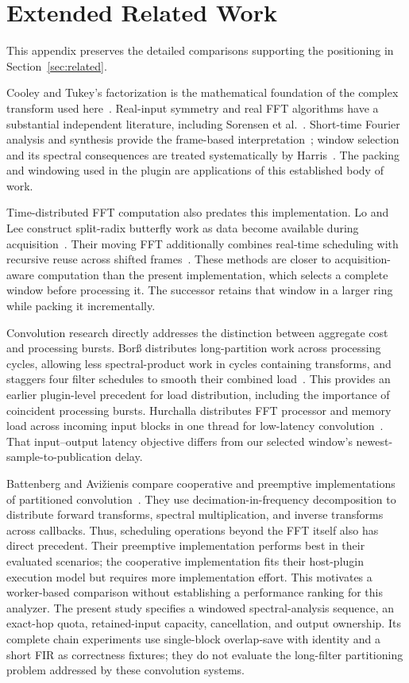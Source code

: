 \section{Extended Related Work}
\label{app:related-work}
This appendix preserves the detailed comparisons supporting the positioning
in Section~\ref{sec:related}.

Cooley and Tukey's factorization is the mathematical foundation of the complex
transform used here~\cite{cooley1965}. Real-input symmetry and real FFT
algorithms have a substantial independent literature, including Sorensen
et al.~\cite{sorensen1987}. Short-time Fourier analysis and synthesis provide
the frame-based interpretation~\cite{allen1977}; window selection and its
spectral consequences are treated systematically by Harris~\cite{harris1978}.
The packing and windowing used in the plugin are applications of this established
body of work.

Time-distributed FFT computation also predates this implementation. Lo and Lee
construct split-radix butterfly work as data become available during
acquisition~\cite{lo1998,lo1999}. Their moving FFT additionally combines
real-time scheduling with recursive reuse across shifted
frames~\cite{lomoving1999}. These methods are closer to acquisition-aware
computation than the present implementation, which selects a complete
window before processing it. The successor retains that window in a larger
ring while packing it incrementally.

Convolution research directly addresses the distinction between aggregate
cost and processing bursts. Bor\ss{} distributes long-partition work across
processing cycles, allowing less spectral-product work in cycles containing
transforms, and staggers four filter schedules to smooth their combined
load~\cite{borss2009}. This provides an earlier plugin-level precedent for
load distribution, including the importance of coincident processing bursts.
Hurchalla distributes FFT processor and memory load across incoming input
blocks in one thread for low-latency convolution~\cite{hurchalla2010}.
That input--output latency objective differs from our selected window's
newest-sample-to-publication delay.

Battenberg and Avi\v{z}ienis compare cooperative and preemptive implementations
of partitioned convolution~\cite{battenberg2011}. They use
decimation-in-frequency decomposition to distribute forward transforms,
spectral multiplication, and inverse transforms across callbacks. Thus,
scheduling operations beyond the FFT itself also has direct precedent.
Their preemptive implementation performs best in their evaluated scenarios;
the cooperative implementation fits their host-plugin execution model but
requires more implementation effort. This motivates a worker-based comparison
without establishing a performance ranking for this analyzer.
The present study specifies a windowed spectral-analysis sequence, an exact-hop
quota, retained-input capacity, cancellation, and output ownership. Its complete
chain experiments use single-block overlap-save with identity and a short FIR
as correctness fixtures; they do not evaluate the long-filter partitioning
problem addressed by these convolution systems.

